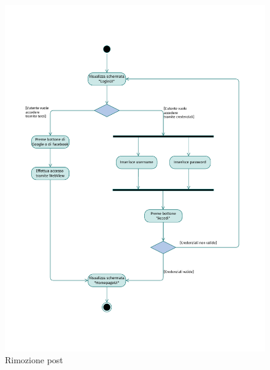 \documentclass{natourDoc}
\begin{document}
\newpage
\begin{figure}[!htbp]
	\centering
	\includegraphics[width=\textwidth, page=5]{./diagrams/activity.pdf}
	\caption{Rimozione post}
\end{figure}
\FloatBarrier
\end{document}
